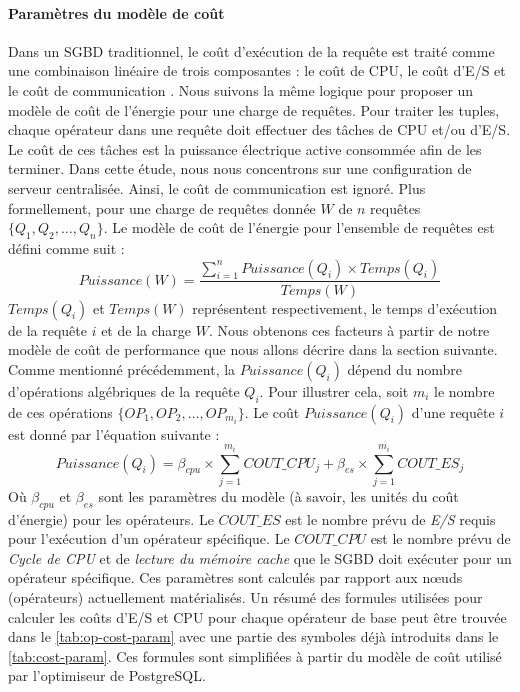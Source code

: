 \paragraph{Paramètres du modèle de coût}\label{subsubsec:ModelParameters}
Dans un SGBD traditionnel, le coût d'exécution de la requête est traité comme une combinaison linéaire de trois composantes : le coût de CPU, le coût d'E/S et le coût de communication \cite{Xu13}. Nous suivons la même logique pour proposer un modèle de coût de l'énergie pour une charge de requêtes.
Pour traiter les tuples, chaque opérateur dans une requête doit effectuer des tâches de CPU et/ou d'E/S. Le coût de ces tâches est la puissance électrique active consommée afin de les terminer. Dans cette étude, nous nous concentrons sur une configuration de serveur centralisée. Ainsi, le coût de communication est ignoré.
Plus formellement, pour une charge de requêtes donnée $W$ de $n$ requêtes $\{Q_1, Q_2, \dots, Q_n\}$. Le modèle de coût de l'énergie pour l'ensemble de requêtes est défini comme suit :
\begin{equation}
Puissance(W) =  \frac{\sum_{i=1}^{n} Puissance(Q_i) \times Temps(Q_i)}{Temps(W)}
\end{equation}
$ Temps(Q_i)$ et $Temps(W)$ représentent respectivement, le temps d'exécution de la requête $i$ et de la charge $W$. Nous obtenons ces facteurs à partir de notre modèle de coût de performance que nous allons décrire dans la section suivante.
Comme mentionné précédemment, la $Puissance(Q_i)$ dépend du nombre d'opérations algébriques de la requête $Q_i$. Pour illustrer cela, soit $m_i$ le nombre de ces opérations $\{OP_1, OP_2, \dots, OP_{m_i}\}$. Le coût $Puissance(Q_i)$ d'une requête $i$ est donné par l'équation suivante : %
\begin{equation} \label{eq:power-cost-model}
Puissance({Q_i}) = \beta_{cpu} \times \sum_{j=1}^{m_i} COUT\_CPU_j + \beta_{es} \times  \sum_{j=1}^{m_i} COUT\_ES_j
\end{equation}
Où $\beta_{cpu}$ et $\beta_{es}$ sont les paramètres du modèle (à savoir, les unités du coût d'énergie) pour les opérateurs.
Le $COUT\_ES$ est le nombre prévu de \textit{E/S} requis pour l'exécution d'un opérateur spécifique.
Le $COUT\_CPU$ est le nombre prévu de \textit{Cycle de CPU} et de \textit{lecture du mémoire cache} que le SGBD doit exécuter pour un opérateur spécifique.
Ces paramètres sont calculés par rapport aux nœuds (opérateurs) actuellement matérialisés.
Un résumé des formules utilisées pour calculer les coûts d'E/S et CPU pour chaque opérateur de base peut être trouvée dans le \ref{tab:op-cost-param} avec une partie des symboles déjà introduits dans le \ref{tab:cost-param}. Ces formules sont simplifiées à partir du modèle de coût utilisé par l'optimiseur de PostgreSQL.

